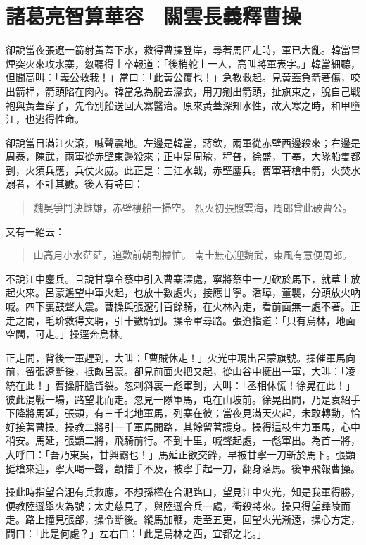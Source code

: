 
\chapter{諸葛亮智算華容　關雲長義釋曹操}

卻說當夜張遼一箭射黃蓋下水，救得曹操登岸，尋著馬匹走時，軍已大亂。韓當冒煙突火來攻水寨，忽聽得士卒報道：「後梢舵上一人，高叫將軍表字。」韓當細聽，但聞高叫：「義公救我！」當曰：「此黃公覆也！」急教救起。見黃蓋負箭著傷，咬出箭桿，箭頭陷在肉內。韓當急為脫去濕衣，用刀剜出箭頭，扯旗束之，脫自己戰袍與黃蓋穿了，先令別船送回大寨醫治。原來黃蓋深知水性，故大寒之時，和甲墮江，也逃得性命。

卻說當日滿江火滾，喊聲震地。左邊是韓當，蔣欽，兩軍從赤壁西邊殺來；右邊是周泰，陳武，兩軍從赤壁東邊殺來；正中是周瑜，程普，徐盛，丁奉，大隊船隻都到，火須兵應，兵仗火威。此正是：三江水戰，赤壁鏖兵。曹軍著槍中箭，火焚水溺者，不計其數。後人有詩曰：

\begin{quote}
魏吳爭鬥決雌雄，赤壁樓船一掃空。
烈火初張照雲海，周郎曾此破曹公。
\end{quote}

又有一絕云：

\begin{quote}
山高月小水茫茫，追歎前朝割據忙。
南士無心迎魏武，東風有意便周郎。
\end{quote}

不說江中鏖兵。且說甘寧令蔡中引入曹寨深處，寧將蔡中一刀砍於馬下，就草上放起火來。呂蒙遙望中軍火起，也放十數處火，接應甘寧。潘璋，董襲，分頭放火吶喊。四下裏鼓聲大震。曹操與張遼引百餘騎，在火林內走，看前面無一處不著。正走之間，毛玠救得文聘，引十數騎到。操令軍尋路。張遼指道：「只有烏林，地面空闊，可走。」操逕奔烏林。

正走間，背後一軍趕到，大叫：「曹賊休走！」火光中現出呂蒙旗號。操催軍馬向前，留張遼斷後，抵敵呂蒙。卻見前面火把又起，從山谷中擁出一軍，大叫：「凌統在此！」曹操肝膽皆裂。忽刺斜裏一彪軍到，大叫：「丞相休慌！徐晃在此！」彼此混戰一場，路望北而走。忽見一隊軍馬，屯在山坡前。徐晃出問，乃是袁紹手下降將馬延，張顗，有三千北地軍馬，列寨在彼；當夜見滿天火起，未敢轉動，恰好接著曹操。操教二將引一千軍馬開路，其餘留著護身。操得這枝生力軍馬，心中稍安。馬延，張顗二將，飛騎前行。不到十里，喊聲起處，一彪軍出。為首一將，大呼曰：「吾乃東吳，甘興霸也！」馬延正欲交鋒，早被甘寧一刀斬於馬下。張顗挺槍來迎，寧大喝一聲，顗措手不及，被寧手起一刀，翻身落馬。後軍飛報曹操。

操此時指望合淝有兵救應，不想孫權在合淝路口，望見江中火光，知是我軍得勝，便教陸遜舉火為號；太史慈見了，與陸遜合兵一處，衝殺將來。操只得望彝陵而走。路上撞見張郃，操令斷後。縱馬加鞭，走至五更，回望火光漸遠，操心方定，問曰：「此是何處？」左右曰：「此是烏林之西，宜都之北。」

